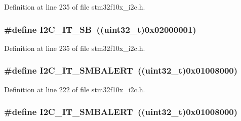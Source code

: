 Definition at line 235 of file stm32f10x\+\_\+i2c.\+h.

\subsubsection[{\texorpdfstring{I2\+C\+\_\+\+I\+T\+\_\+\+SB}{I2C_IT_SB}}]{\setlength{\rightskip}{0pt plus 5cm}\#define I2\+C\+\_\+\+I\+T\+\_\+\+SB~(({\bf uint32\+\_\+t})0x02000001)}\hypertarget{group___i2_c__interrupts__definition_gaec2fb9bbd0e1b128b4450b2a7b312896}{}\label{group___i2_c__interrupts__definition_gaec2fb9bbd0e1b128b4450b2a7b312896}


Definition at line 235 of file stm32f10x\+\_\+i2c.\+h.

\subsubsection[{\texorpdfstring{I2\+C\+\_\+\+I\+T\+\_\+\+S\+M\+B\+A\+L\+E\+RT}{I2C_IT_SMBALERT}}]{\setlength{\rightskip}{0pt plus 5cm}\#define I2\+C\+\_\+\+I\+T\+\_\+\+S\+M\+B\+A\+L\+E\+RT~(({\bf uint32\+\_\+t})0x01008000)}\hypertarget{group___i2_c__interrupts__definition_gab6049d4dd856a085127752e01ebb8120}{}\label{group___i2_c__interrupts__definition_gab6049d4dd856a085127752e01ebb8120}


Definition at line 222 of file stm32f10x\+\_\+i2c.\+h.

\subsubsection[{\texorpdfstring{I2\+C\+\_\+\+I\+T\+\_\+\+S\+M\+B\+A\+L\+E\+RT}{I2C_IT_SMBALERT}}]{\setlength{\rightskip}{0pt plus 5cm}\#define I2\+C\+\_\+\+I\+T\+\_\+\+S\+M\+B\+A\+L\+E\+RT~(({\bf uint32\+\_\+t})0x01008000)}\hypertarget{group___i2_c__interrupts__definition_gab6049d4dd856a085127752e01ebb8120}{}\label{group___i2_c__interrupts__definition_gab6049d4dd856a085127752e01ebb8120}


